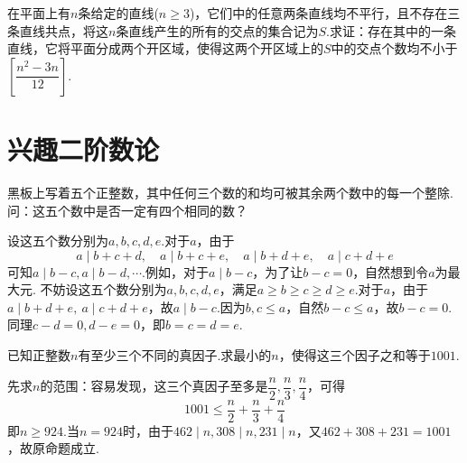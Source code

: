 \documentclass[cn,hazy,black,10pt,normal]{elegantnote}
\newenvironment{guess}{
  \color{guess}}{\newline \color{black}}
\begin{document}
\begin{problem} %
	在平面上有$n$条给定的直线($n \geq 3$)，它们中的任意两条直线均不平行，且不存在三条直线共点，将这$n$条直线产生的所有的交点的集合记为$S$.求证：存在其中的一条直线，它将平面分成两个开区域，使得这两个开区域上的$S$中的交点个数均不小于$\left[ \dfrac{n^2-3n}{12} \right]$.
\end{problem}
\begin{solution}
	
\end{solution}


\chapter{兴趣二阶数论}

\begin{problem} %
	黑板上写着五个正整数，其中任何三个数的和均可被其余两个数中的每一个整除.问：这五个数中是否一定有四个相同的数？
\end{problem}
\begin{solution}
	\begin{guess}
		设这五个数分别为$a,b,c,d,e$.对于$a$，由于$$a\mid b+c+d,\quad a\mid b+c+e,\quad a\mid b+d+e,\quad a\mid c+d+e$$
		可知$a\mid b-c,a\mid b-d,\cdots$.例如，对于$a\mid b-c$，为了让$b-c=0$，自然想到令$a$为最大元.
	\end{guess}
	不妨设这五个数分别为$a,b,c,d,e$，满足$a \geq b \geq c \geq d \geq e$.对于$a$，由于$a\mid b+d+e,~a\mid c+d+e$，故$a\mid b-c$.因为$b,c \leq a$，自然$b-c \leq a$，故$b-c=0$.同理$c-d=0,d-e=0$，即$b=c=d=e$.
\end{solution}

\begin{problem} %
	已知正整数$n$有至少三个不同的真因子.求最小的$n$，使得这三个因子之和等于$1001$.
\end{problem}
\begin{solution}
	先求$n$的范围：容易发现，这三个真因子至多是$\dfrac{n}{2},\dfrac{n}{3},\dfrac{n}{4}$，可得$$1001 \leq \frac{n}{2} + \frac{n}{3} + \frac{n}{4}$$
	即$n \geq 924$.当$n=924$时，由于$462\mid n,308\mid n,231\mid n$，又$462+308+231=1001$，故原命题成立.
\end{solution}
\end{document}
